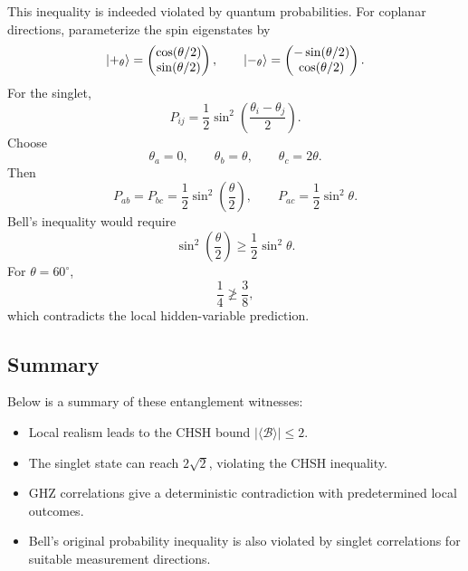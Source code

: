 This inequality is indeeded violated by quantum probabilities. For coplanar directions, parameterize the spin eigenstates by
\begin{equation}
 |{+_{\theta}}\rangle=
 \begin{pmatrix}\cos(\theta/2)\\ \sin(\theta/2)\end{pmatrix},
 \qquad
 |{-_{\theta}}\rangle=
 \begin{pmatrix}-\sin(\theta/2)\\ \cos(\theta/2)\end{pmatrix}.
\end{equation}
For the singlet,
\begin{equation}
 P_{ij}=\frac12\sin^2\!\left(\frac{\theta_i-\theta_j}{2}\right).
\end{equation}
Choose
\begin{equation}
 \theta_a=0,\qquad \theta_b=\theta,\qquad \theta_c=2\theta.
\end{equation}
Then
\begin{equation}
 P_{ab}=P_{bc}=\frac12\sin^2\!\left(\frac\theta2\right),
 \qquad P_{ac}=\frac12\sin^2\theta.
\end{equation}
Bell's inequality would require
\begin{equation}
 \sin^2\!\left(\frac\theta2\right)\geq\frac12\sin^2\theta.
\end{equation}
For $\theta=60^\circ$,
\begin{equation}
 \frac14\not\geq\frac38,
\end{equation}
which contradicts the local hidden-variable prediction.

\subsection{Summary}

Below is a summary of these entanglement witnesses:
\begin{itemize}
 \item Local realism leads to the CHSH bound
       $|\langle\mathcal B\rangle|\leq2$.
 \item The singlet state can reach $2\sqrt2$, violating the CHSH inequality.
 \item GHZ correlations give a deterministic contradiction with predetermined
       local outcomes.
 \item Bell's original probability inequality is also violated by singlet
       correlations for suitable measurement directions.
\end{itemize}


